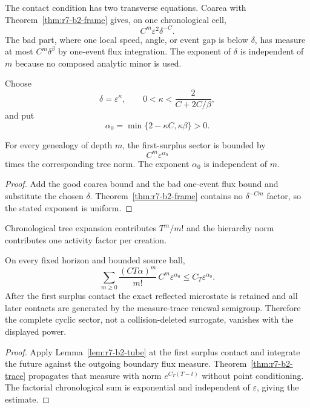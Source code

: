The contact condition has two transverse equations.  Coarea with
Theorem~\ref{thm:r7-b2-frame} gives, on one chronological cell,
\[
 C^m\varepsilon^2\delta^{-C}.
\]
The bad part, where one local speed, angle, or event gap is below $\delta$, has
measure at most $C^m\delta^\beta$ by one-event flux integration.  The exponent
of $\delta$ is independent of $m$ because no composed analytic minor is used.

Choose
\[
 \delta=\varepsilon^\kappa,
 \qquad
 0<\kappa<\frac{2}{C+2C/\beta},
\]
and put
\[
 \alpha_0=\min\{2-\kappa C,\kappa\beta\}>0.
\]

\begin{lemma}
\label{lem:r7-b2-tube}
For every genealogy of depth $m$, the first-surplus sector is bounded by
\[
 C^m\varepsilon^{\alpha_0}
\]
times the corresponding tree norm.  The exponent $\alpha_0$ is independent of
$m$.
\end{lemma}

\begin{proof}
Add the good coarea bound and the bad one-event flux bound and substitute the
chosen $\delta$.  Theorem~\ref{thm:r7-b2-frame} contains no
$\delta^{-Cm}$ factor, so the stated exponent is uniform.
\end{proof}

Chronological tree expansion contributes $T^m/m!$ and the hierarchy norm
contributes one activity factor per creation.

\begin{theorem}
\label{thm:r7-b2-cyclic}
On every fixed horizon and bounded source ball,
\[
 \sum_{m\ge0}\frac{(CT\alpha)^m}{m!}
  \,C^m\varepsilon^{\alpha_0}
 \le C_T\varepsilon^{\alpha_0}.
\]
After the first surplus contact the exact reflected microstate is retained and
all later contacts are generated by the measure-trace renewal semigroup.
Therefore the complete cyclic sector, not a collision-deleted surrogate,
vanishes with the displayed power.
\end{theorem}

\begin{proof}
Apply Lemma~\ref{lem:r7-b2-tube} at the first surplus contact and integrate the
future against the outgoing boundary flux measure.  Theorem~\ref{thm:r7-b2-trace}
propagates that measure with norm $e^{C_T(T-t)}$ without point conditioning.
The factorial chronological sum is exponential and independent of
$\varepsilon$, giving the estimate.
\end{proof}

